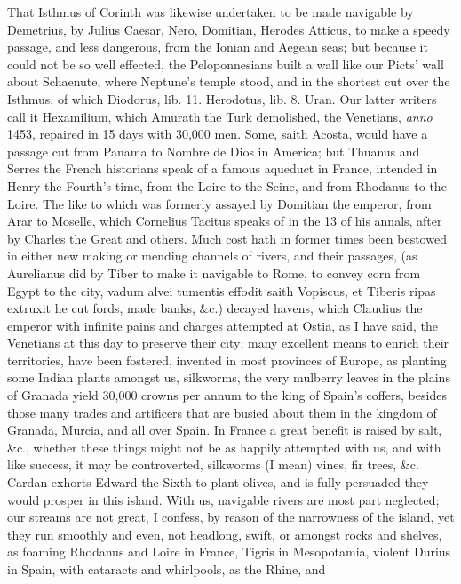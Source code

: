 {That Isthmus of Corinth was likewise undertaken to be made navigable by
Demetrius, by Julius Caesar, Nero, Domitian, Herodes Atticus, to make a
speedy passage, and less dangerous, from the Ionian and Aegean
seas; but because it could not be so well effected, the Peloponnesians
built a wall like our Picts' wall about Schaenute, where Neptune's
temple stood, and in the shortest cut over the Isthmus, of which
Diodorus, lib. 11. Herodotus, lib. 8. Uran. Our latter writers call it
Hexamilium, which Amurath the Turk demolished, the Venetians, \emph{anno}
1453, repaired in 15 days with 30,000 men. Some, saith Acosta, would
have a passage cut from Panama to Nombre de Dios in America; but
Thuanus and Serres the French historians speak of a famous aqueduct in
France, intended in Henry the Fourth's time, from the Loire to the
Seine, and from Rhodanus to the Loire. The like to which was formerly
assayed by Domitian the emperor, from Arar to Moselle, which
Cornelius Tacitus speaks of in the 13 of his annals, after by Charles
the Great and others. Much cost hath in former times been bestowed in
either new making or mending channels of rivers, and their passages,
(as Aurelianus did by Tiber to make it navigable to Rome, to convey
corn from Egypt to the city, vadum alvei tumentis effodit saith
Vopiscus, et Tiberis ripas extruxit he cut fords, made banks, \&c.)
decayed havens, which Claudius the emperor with infinite pains and
charges attempted at Ostia, as I have said, the Venetians at this day
to preserve their city; many excellent means to enrich their
territories, have been fostered, invented in most provinces of Europe,
as planting some Indian plants amongst us, silkworms, the very
mulberry leaves in the plains of Granada yield 30,000 crowns per annum
to the king of Spain's coffers, besides those many trades and
artificers that are busied about them in the kingdom of Granada,
Murcia, and all over Spain. In France a great benefit is raised by
salt, \&c., whether these things might not be as happily attempted with
us, and with like success, it may be controverted, silkworms (I mean)
vines, fir trees, \&c. Cardan exhorts Edward the Sixth to plant olives,
and is fully persuaded they would prosper in this island. With us,
navigable rivers are most part neglected; our streams are not great, I
confess, by reason of the narrowness of the island, yet they run
smoothly and even, not headlong, swift, or amongst rocks and shelves,
as foaming Rhodanus and Loire in France, Tigris in Mesopotamia, violent
Durius in Spain, with cataracts and whirlpools, as the Rhine, and
}

